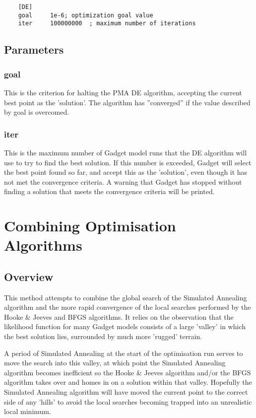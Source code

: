 \documentclass[10pt,twoside]{book}
\begin{document}
{\small\begin{verbatim}
	[DE]
	goal     1e-6; optimization goal value
	iter     100000000  ; maximum number of iterations
	\end{verbatim}}

\subsection{Parameters}\label{subsec:depar}
\subsubsection{goal}

This is the criterion for halting the PMA DE algorithm, accepting the current best point as the 'solution'.  The algorithm has ''converged'' if the value described by goal is overcomed.

\subsubsection{iter}
This is the maximum number of Gadget model runs that the DE algorithm will use to try to find the best solution.  If this number is exceeded, Gadget will select the best point found so far, and accept this as the 'solution', even though it has not met the convergence criteria.  A warning that Gadget has stopped without finding a solution that meets the convergence criteria will be printed.

\section{Combining Optimisation Algorithms}\label{sec:combine}
\subsection{Overview}\label{subsec:combineover}
This method attempts to combine the global search of the Simulated Annealing algorithm and the more rapid convergence of the local searches performed by the Hooke \& Jeeves and BFGS algorithms.  It relies on the observation that the likelihood function for many Gadget models consists of a large 'valley' in which the best solution lies, surrounded by much more 'rugged' terrain.

\bigskip
A period of Simulated Annealing at the start of the optimisation run serves to move the search into this valley, at which point the Simulated Annealing algorithm becomes inefficient so the Hooke \& Jeeves algorithm and/or the BFGS algorithm takes over and homes in on a solution within that valley.  Hopefully the Simulated Annealing algorithm will have moved the current point to the correct side of any 'hills' to avoid the local searches becoming trapped into an unrealistic local minimum.
\end{document}
